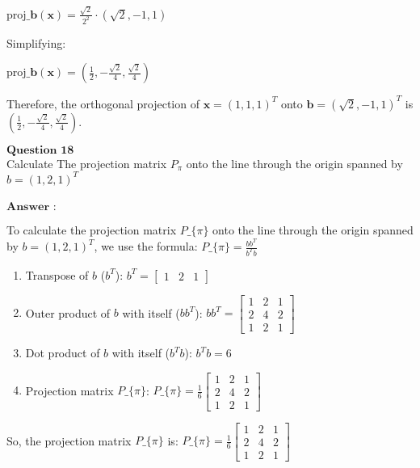 \documentclass[11pt]{article}
\begin{document}
$ \text{proj}\_\mathbf{b}(\mathbf{x}) = \frac{\sqrt{2}}{2^2}
\cdot (\sqrt{2}, -1, 1) $

Simplifying:

$ \text{proj}\_\mathbf{b}(\mathbf{x}) = \left(\frac{1}{2},
-\frac{\sqrt{2}}{4}, \frac{\sqrt{2}}{4}\right) $

Therefore, the orthogonal projection of $ \mathbf{x} = (1,1,1)^T $
onto $ \mathbf{b} = (\sqrt{2}, -1, 1)^T $ is $ \left(\frac{1}{2},
-\frac{\sqrt{2}}{4}, \frac{\sqrt{2}}{4}\right) $.

    $\textbf{Question 18}$\\
Calculate The projection matrix $P_π$ onto the line through the origin
spanned by $b=(1,2,1)^T$\\
~\\
$\textbf{Answer :}$

    To calculate the projection matrix $ P\_\{\pi\} $ onto the line
through the origin spanned by $ b = (1, 2, 1)^T $, we use the
formula: $ P\_\{\pi\} = \frac{bb^T}{b^Tb} $

\begin{enumerate}
\def\labelenumi{\arabic{enumi}.}
\item
  Transpose of $ b $ ($ b^T $): $ b^T =
  \begin{bmatrix} 1 & 2 & 1 \end{bmatrix}
  $
\item
  Outer product of $ b $ with itself ($ bb^T $): $ bb^T =
  \begin{bmatrix} 1 & 2 & 1 \\ 2 & 4 & 2 \\ 1 & 2 & 1 \end{bmatrix}
  $
\item
  Dot product of $ b $ with itself ($ b^Tb $): $ b^Tb = 6 $
\item
  Projection matrix $ P\_\{\pi\} $: $ P\_\{\pi\} = \frac{1}{6}
  \begin{bmatrix} 1 & 2 & 1 \\ 2 & 4 & 2 \\ 1 & 2 & 1 \end{bmatrix}
  $
\end{enumerate}

So, the projection matrix $ P\_\{\pi\} $ is: $ P\_\{\pi\} =
\frac{1}{6}
\begin{bmatrix} 1 & 2 & 1 \\ 2 & 4 & 2 \\ 1 & 2 & 1 \end{bmatrix}
$
\end{document}
